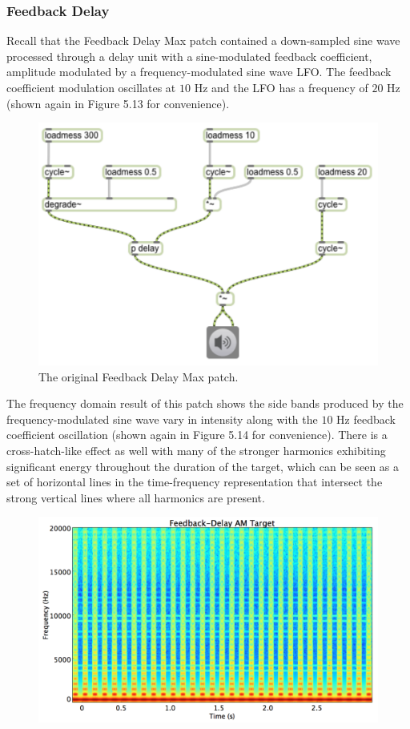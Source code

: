 \documentclass[12pt]{report} 	%
\numberwithin{figure}{chapter}
\numberwithin{table}{chapter}
\numberwithin{equation}{chapter}
\begin{document}
\begin{flushleft}
\subsubsection{Feedback Delay}
Recall that the Feedback Delay Max patch contained a down-sampled sine wave processed through a delay unit with a sine-modulated feedback coefficient, amplitude modulated by a frequency-modulated sine wave LFO. The feedback coefficient modulation oscillates at $10$ Hz and the LFO has a frequency of $20$ Hz (shown again in Figure 5.13 for convenience).
\begin{figure}[h!]
\begin{center}
\includegraphics[scale=0.8]{DelayFeedbackAM}
\caption[Original feedback delay Max patch]{The original Feedback Delay Max patch.}
\end{center}
\end{figure}
The frequency domain result of this patch shows the side bands produced by the frequency-modulated sine wave vary in intensity along with the $10$ Hz feedback coefficient oscillation (shown again in Figure 5.14 for convenience). There is a cross-hatch-like effect as well with many of the stronger harmonics exhibiting significant energy throughout the duration of the target, which can be seen as a set of horizontal lines in the time-frequency representation that intersect the strong vertical lines where all harmonics are present.
\begin{figure}[h!]
\begin{center}
\includegraphics[scale=0.35,width=\linewidth]{FeedbackDelayAMTargetSTFT}

\end{center}
\end{figure}
\end{flushleft}
\end{document}
